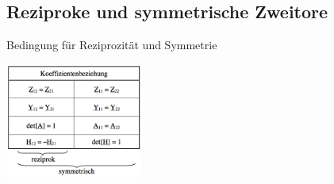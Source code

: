 
\begin{multicols}{2}
\subsection{Reziproke und symmetrische Zweitore}
	Bedingung für Reziprozität und Symmetrie\\
	\begin{minipage}{4cm}
		\includegraphics[height=3.8cm]{./bilder/Rezipro_Sym_Bedingung}\\
	\end{minipage}
			

\end{multicols}
